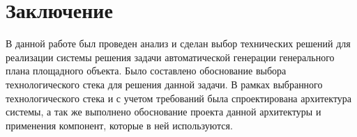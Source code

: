 \section*{\Large{Заключение}}
В данной работе был проведен анализ и сделан выбор технических решений для реализации системы
решения задачи автоматической генерации генерального плана площадного объекта.
Было составлено обоснование выбора технологического стека для решения данной задачи.
В рамках выбранного технологического стека и с учетом требований была спроектирована архитектура системы,
а так же выполнено обоснование проекта данной архитектуры и применения компонент, которые в ней используются.